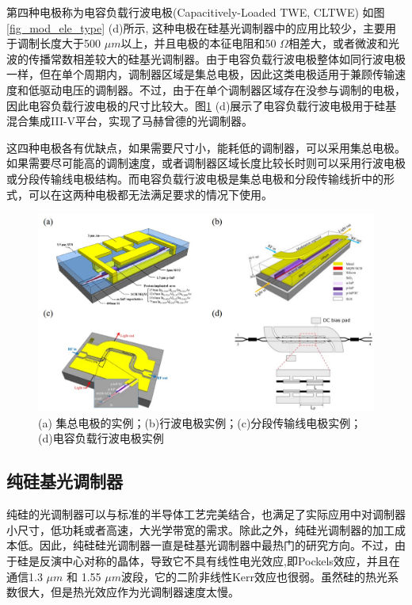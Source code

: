 第四种电极称为电容负载行波电极(Capacitively-Loaded TWE, CLTWE) 如图\ref{fig_mod_ele_type} (d)所示, 这种电极在硅基光调制器中的应用比较少，主要用于调制长度大于500 $\mu m$以上，并且电极的本征电阻和50 $\Omega$相差大，或者微波和光波的传播常数相差较大的硅基光调制器。由于电容负载行波电极整体如同行波电极一样，但在单个周期内，调制器区域是集总电极，因此这类电极适用于兼顾传输速度和低驱动电压的调制器。不过，由于在单个调制器区域存在没参与调制的电极，因此电容负载行波电极的尺寸比较大。图\ref{fig_mod_ele_type_real} (d)展示了电容负载行波电极用于硅基混合集成III-V平台\cite{tang2012energy}，实现了马赫曾德的光调制器。

这四种电极各有优缺点，如果需要尺寸小，能耗低的调制器，可以采用集总电极。如果需要尽可能高的调制速度，或者调制器区域长度比较长时则可以采用行波电极或分段传输线电极结构。而电容负载行波电极是集总电极和分段传输线折中的形式，可以在这两种电极都无法满足要求的情况下使用。
\begin{figure}[htb]
	\centering
	\includegraphics[width=12cm]{./Pictures/fig_mod_ele_type_real.jpg}
	\caption{ (a) 集总电极的实例\cite{tang2012energy}；(b)行波电极实例\cite{tang201150}；(c)分段传输线电极实例\cite{tang2012over}；(d)电容负载行波电极实例\cite{chen2011forty}}
	\label{fig_mod_ele_type_real}
\end{figure}
\subsection{纯硅基光调制器} \label{pure_simodulator}
纯硅的光调制器可以与标准的半导体工艺完美结合，也满足了实际应用中对调制器小尺寸，低功耗或者高速，大光学带宽的需求。除此之外，纯硅光调制器的加工成本低。因此，纯硅硅光调制器一直是硅基光调制器中最热门的研究方向。不过，由于硅是反演中心对称的晶体，导致它不具有线性电光效应,即Pockels效应，并且在通信1.3 $\mu m$ 和 1.55 $\mu m$波段，它的二阶非线性Kerr效应也很弱\cite{soref1987electrooptical}。虽然硅的热光系数很大，但是热光效应作为光调制器速度太慢\cite{cocorullo1992thermo}。

